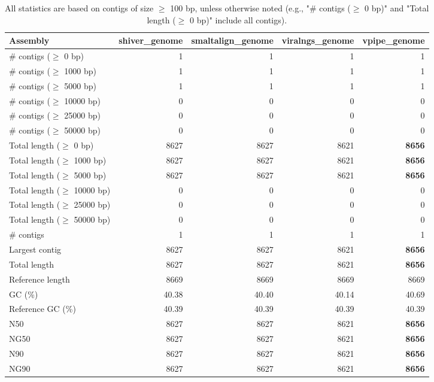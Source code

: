 \documentclass[12pt,a4paper]{article}
\begin{document}
\begin{table}[ht]
\begin{center}
\caption{All statistics are based on contigs of size $\geq$ 100 bp, unless otherwise noted (e.g., "\# contigs ($\geq$ 0 bp)" and "Total length ($\geq$ 0 bp)" include all contigs).}
\begin{tabular}{|l*{4}{|r}|}
\hline
Assembly & shiver\_genome & smaltalign\_genome & viralngs\_genome & vpipe\_genome \\ \hline
\# contigs ($\geq$ 0 bp) & 1 & 1 & 1 & 1 \\ \hline
\# contigs ($\geq$ 1000 bp) & 1 & 1 & 1 & 1 \\ \hline
\# contigs ($\geq$ 5000 bp) & 1 & 1 & 1 & 1 \\ \hline
\# contigs ($\geq$ 10000 bp) & 0 & 0 & 0 & 0 \\ \hline
\# contigs ($\geq$ 25000 bp) & 0 & 0 & 0 & 0 \\ \hline
\# contigs ($\geq$ 50000 bp) & 0 & 0 & 0 & 0 \\ \hline
Total length ($\geq$ 0 bp) & 8627 & 8627 & 8621 & {\bf 8656} \\ \hline
Total length ($\geq$ 1000 bp) & 8627 & 8627 & 8621 & {\bf 8656} \\ \hline
Total length ($\geq$ 5000 bp) & 8627 & 8627 & 8621 & {\bf 8656} \\ \hline
Total length ($\geq$ 10000 bp) & 0 & 0 & 0 & 0 \\ \hline
Total length ($\geq$ 25000 bp) & 0 & 0 & 0 & 0 \\ \hline
Total length ($\geq$ 50000 bp) & 0 & 0 & 0 & 0 \\ \hline
\# contigs & 1 & 1 & 1 & 1 \\ \hline
Largest contig & 8627 & 8627 & 8621 & {\bf 8656} \\ \hline
Total length & 8627 & 8627 & 8621 & {\bf 8656} \\ \hline
Reference length & 8669 & 8669 & 8669 & 8669 \\ \hline
GC (\%) & 40.38 & 40.40 & 40.14 & 40.69 \\ \hline
Reference GC (\%) & 40.39 & 40.39 & 40.39 & 40.39 \\ \hline
N50 & 8627 & 8627 & 8621 & {\bf 8656} \\ \hline
NG50 & 8627 & 8627 & 8621 & {\bf 8656} \\ \hline
N90 & 8627 & 8627 & 8621 & {\bf 8656} \\ \hline
NG90 & 8627 & 8627 & 8621 & {\bf 8656} \\ \hline

\end{tabular}
\end{center}
\end{table}
\end{document}
